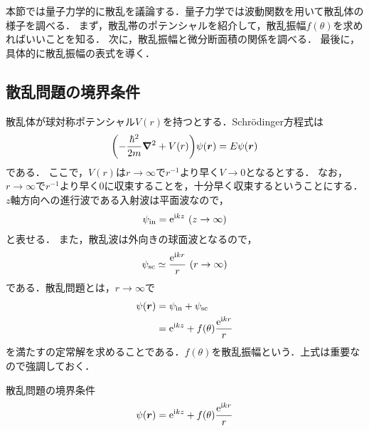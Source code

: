 \documentclass{report}
\begin{document}
  本節では量子力学的に散乱を議論する．量子力学では波動関数を用いて散乱体の様子を調べる．
  まず，散乱帯のポテンシャルを紹介して，散乱振幅$f(\theta)$を求めればいいことを知る．
  次に，散乱振幅と微分断面積の関係を調べる．
  最後に，具体的に散乱振幅の表式を導く．
  \subsection{散乱問題の境界条件}
    散乱体が球対称ポテンシャル$V(r)$を持つとする．Schrödinger方程式は
    \begin{align}
      \qty(-\frac{\hbar^2}{2m}\grad^2 + V(r))\psi(\bm{r}) = E \psi(\bm{r})\label{se-scattering}
    \end{align}
    である．
    ここで，$V(r)$は$r \to \infty$で$r^{-1}$より早く$V \to 0$となるとする．
    なお，$r \to \infty$で$r^{-1}$より早く$0$に収束することを，十分早く収束するということにする．
    $z$軸方向への進行波である入射波は平面波なので，
    \begin{align}
      \psi_{\mathrm{in}} = \mathrm{e}^{\mathrm{i} k z}\ (z \to \infty)
    \end{align}
    と表せる．
    また，散乱波は外向きの球面波となるので，
    \begin{align}
      \psi_{\mathrm{sc}} \simeq \frac{\mathrm{e}^{\mathrm{i} kr}}{r}\ (r \to \infty)
    \end{align}
    である．散乱問題とは，$r \to \infty$で
    \begin{align}
      \psi(\bm{r}) &= \psi_{\mathrm{in}} + \psi_{\mathrm{sc}} \\ 
      &= \mathrm{e}^{\mathrm{i} kz} + f(\theta) \frac{\mathrm{e}^{\mathrm{i} kr}}{r}
    \end{align}
    を満たすの定常解を求めることである．$f(\theta)$を散乱振幅という．上式は重要なので強調しておく．
    \begin{itembox}[l]{散乱問題の境界条件}
      \begin{align}
        \psi(\bm{r}) = \mathrm{e}^{\mathrm{i} kz} + f(\theta) \frac{\mathrm{e}^{\mathrm{i} kr}}{r}\label{psi-r-in-sc-k}
      \end{align}
    \end{itembox}
\end{document}
